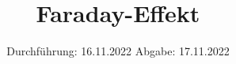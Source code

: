 

\subject{VERSUCH 46}
\title{Faraday-Effekt}
\date{%
  Durchführung: 16.11.2022
  \hspace{3em}
  Abgabe: 17.11.2022
}



\maketitle
\thispagestyle{empty}
\tableofcontents
\newpage







\printbibliography{}


